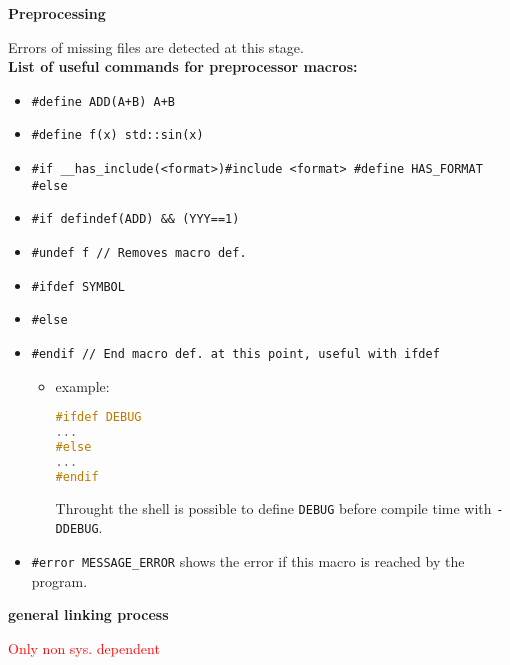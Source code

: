 \documentclass[fontsize=8pt, a4paper, landscape, fleqn]{scrartcl}
\renewcommand{\subsection}[1]{%
    \noindent\colorbox{subsectioncolor}{%
        \parbox{\dimexpr\columnwidth-2\fboxsep}{\color{white}\textbf{#1}}}%
    \vspace{0.5mm}%
}
\begin{document}
\begin{multicols*}{3}[\raggedcolumns]
    \subsection{Preprocessing}
    Errors of missing files are detected at this stage.\\
    \textbf{List of useful commands for preprocessor macros:}
    \begin{itemize}
        \item \lstinline{#define ADD(A+B) A+B}
        \item \lstinline{#define f(x) std::sin(x)}
        \item \lstinline{#if __has_include(<format>)#include <format> #define HAS_FORMAT #else}
        \item \lstinline{#if defindef(ADD) && (YYY==1)}
        \item \lstinline{#undef f // Removes macro def.}
        \item \lstinline{#ifdef SYMBOL}
        \item \lstinline{#else}
        \item \lstinline{#endif // End macro def. at this point, useful with ifdef}
        \begin{itemize}
            \item example: \begin{lstlisting}[language=C, breaklines]
#ifdef DEBUG
...
#else 
...
#endif \end{lstlisting}
        Throught the shell is possible to define \lstinline{DEBUG} before compile time with \lstinline{-DDEBUG}.
        \end{itemize}
        \item \lstinline{#error MESSAGE_ERROR} shows the error if this macro is reached by the program.
    \end{itemize}

	\subsection{general linking process}
    \textcolor{red}{Only non sys. dependent}


\end{multicols*}
\end{document}

